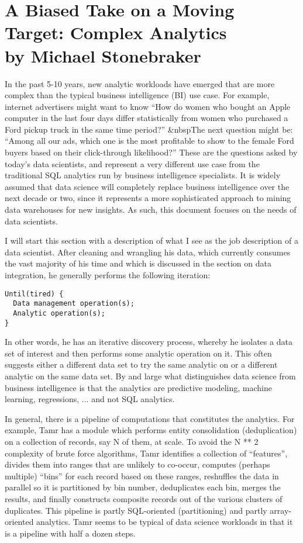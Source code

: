 \documentclass[b5paper,11pt,twoside,openright]{book}
\begin{document}
\hypertarget{ch11-complexanalytics}{
  \chapter[Complex Analytics]{A Biased Take on a Moving Target: Complex Analytics\\{\Large by Michael Stonebraker}}\label{ch11-complexanalytics}
}

In the past 5-10 years, new analytic workloads have emerged that are
more complex than the typical business intelligence (BI) use case. For
example, internet advertisers might want to know ``How do women who
bought an Apple computer in the last four days differ statistically from
women who purchased a Ford pickup truck in the same time period?''
\&nbspThe next question might be: ``Among all our ads, which one is the
most profitable to show to the female Ford buyers based on their
click-through likelihood?'' These are the questions asked by today's
data scientists, and represent a very different use case from the
traditional SQL analytics run by business intelligence specialists. It
is widely assumed that data science will completely replace business
intelligence over the next decade or two, since it represents a more
sophisticated approach to mining data warehouses for new insights. As
such, this document focuses on the needs of data scientists.

I will start this section with a description of what I see as the job
description of a data scientist. After cleaning and wrangling his data,
which currently consumes the vast majority of his time and which is
discussed in the section on data integration, he generally performs the
following iteration:

\begin{verbatim}
Until(tired) {
  Data management operation(s);
  Analytic operation(s);
}
\end{verbatim}

In other words, he has an iterative discovery process, whereby he
isolates a data set of interest and then performs some analytic
operation on it. This often suggests either a different data set to try
the same analytic on or a different analytic on the same data set. By
and large what distinguishes data science from business intelligence is
that the analytics are predictive modeling, machine learning,
regressions, ... and not SQL analytics.

In general, there is a pipeline of computations that constitutes the
analytics. For example, Tamr has a module which performs entity
consolidation (deduplication) on a collection of records, say N of them,
at scale. To avoid the N ** 2 complexity of brute force algorithms, Tamr
identifies a collection of ``features'', divides them into ranges that
are unlikely to co-occur, computes (perhaps multiple) ``bins'' for each
record based on these ranges, reshuffles the data in parallel so it is
partitioned by bin number, deduplicates each bin, merges the results,
and finally constructs composite records out of the various clusters of
duplicates. This pipeline is partly SQL-oriented (partitioning) and
partly array-oriented analytics. Tamr seems to be typical of data
science workloads in that it is a pipeline with half a dozen steps.
\end{document}
